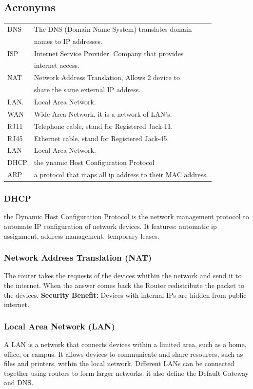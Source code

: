 \documentclass[5pt]{article}
\begin{document}
\begin{multicols}{2}
\subsection{Acronyms}
\begin{tabular}{LL}
  DNS                 & The DNS (Domain Name System) translates domain\\
                      & names to IP addresses. \\
  ISP                 & Internet Service Provider. Company that provides\\
                      & internet access. \\
  NAT                 & Network Address Translation, Allows 2 device to\\
                      & share the same external IP address. \\
  LAN.                & Local Area Network. \\
  WAN                 & Wide Area Network, it is a network of LAN's. \\
  RJ11                & Telephone cable, stand for Registered Jack-11.\\
  RJ45                & Ethernet cable, stand for Registered Jack-45.\\
  LAN                 & Local Area Network. \\
  DHCP                & the ynamic Host Configuration Protocol\\
  ARP                 & a protocol that maps all ip address to their MAC address.\\
\end{tabular}
\subsubsection{DHCP}
the Dynamic Host Configuration Protocol is the network management protocol to automate IP configuration of network devices.
It features: automatic ip assignment, address management, temporary leases.

\subsubsection{Network Address Translation (NAT)}
  The router takes the requests of the devices whithin the network and send it to the internet. 
  When the answer comes back the Router redistribute the packet to the devices.
  \textbf{Security Benefit:} Devices with internal IPs are hidden from public internet.

\subsubsection{Local Area Network (LAN)}
  A LAN is a network that connects devices within a limited area, such as a home, office, or campus. 
  It allows devices to communicate and share resources, such as files and printers, within the local network.
  Different LANs can be connected together using routers to form larger networks. it also define the Default Gateway and DNS. 



\end{multicols}
\end{document}
